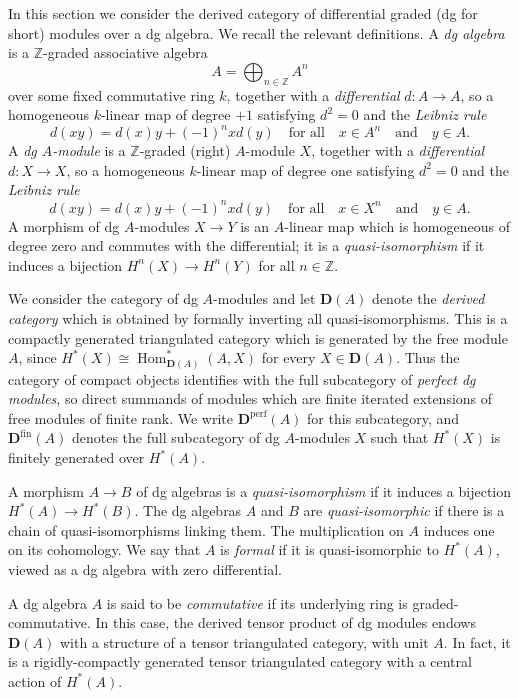 \documentclass{amsart}[a4]
\theoremstyle{definition}
\theoremstyle{remark}
\numberwithin{equation}{section}
\newcommand{\Hom}{\operatorname{Hom}}
\newcommand{\fin}{\mathrm{fin}}
\newcommand{\perf}{\mathrm{perf}}
\newcommand{\bfD}{\mathbf D}
\newcommand{\bbZ}{\mathbb Z}
\begin{document}
In this section we consider the derived category of diﬀerential graded
(dg for short) modules over a dg algebra. We recall the relevant
definitions.  A \emph{dg algebra} is a $\bbZ$-graded associative
algebra \[A=\bigoplus_{n\in\bbZ}A^n\] over some fixed commutative ring
$k$, together with a \emph{differential} $d\colon A\to A$, so a
homogeneous $k$-linear map of degree $+1$ satisfying $d^2=0$ and the
\emph{Leibniz rule}
\[d(xy)=d(x)y+(-1)^nxd(y)\quad\text{for all}\quad x\in
A^n\quad\text{and}\quad y\in A.\] A
\emph{dg $A$-module} is a
$\bbZ$-graded (right) $A$-module $X$, together with a \emph{differential} $d\colon
X\to X$, so a homogeneous $k$-linear map of degree one
satisfying $d^2=0$ and the \emph{Leibniz rule}
\[d(xy)=d(x)y+(-1)^nxd(y)\quad\text{for all}\quad x\in
  X^n\quad\text{and}\quad y\in A.\] A morphism of dg $A$-modules
$X\to Y$ is an $A$-linear map which is homogeneous of degree zero and
commutes with the differential; it is a \emph{quasi-isomorphism} if it
induces a bijection $H^n(X)\to H^n(Y)$ for all $n\in\bbZ$.

We consider the category of dg $A$-modules and let $\bfD(A)$ denote the
\emph{derived category} which is obtained by formally inverting all
quasi-isomorphisms. This is a compactly generated triangulated
category which is generated by the free module $A$, since
$H^*(X)\cong\Hom_{\bfD(A)}^*(A,X)$ for every $X\in\bfD(A)$.  Thus
the category of compact objects identifies with the full subcategory
of \emph{perfect dg modules}, so direct summands of modules which are
finite iterated extensions of free modules of finite rank. We write
$\bfD^\perf(A)$ for this subcategory, and $\bfD^\fin(A)$ denotes the
full subcategory of dg $A$-modules $X$ such that $H^*(X)$ is finitely
generated over $H^*(A)$.

A morphism $A\to B$ of dg algebras is a \emph{quasi-isomorphism} if it
induces a bijection $H^*(A)\to H^*(B)$.
The dg algebras $A$ and $B$ are \emph{quasi-isomorphic} if there is a chain of
quasi-isomorphisms linking them. The multiplication on $A$ induces one
on its cohomology. We say that $A$ is \emph{formal} if it is
quasi-isomorphic to $H^*(A)$, viewed as a dg algebra with zero
diﬀerential.

A dg algebra $A$ is said to be \emph{commutative} if its underlying
ring is graded-commutative.  In this case, the derived tensor product
of dg modules endows $\bfD(A)$ with a structure of a tensor triangulated
category, with unit $A$. In fact, it is a rigidly-compactly generated
tensor triangulated category with a central action of $H^*(A)$.
\end{document}

